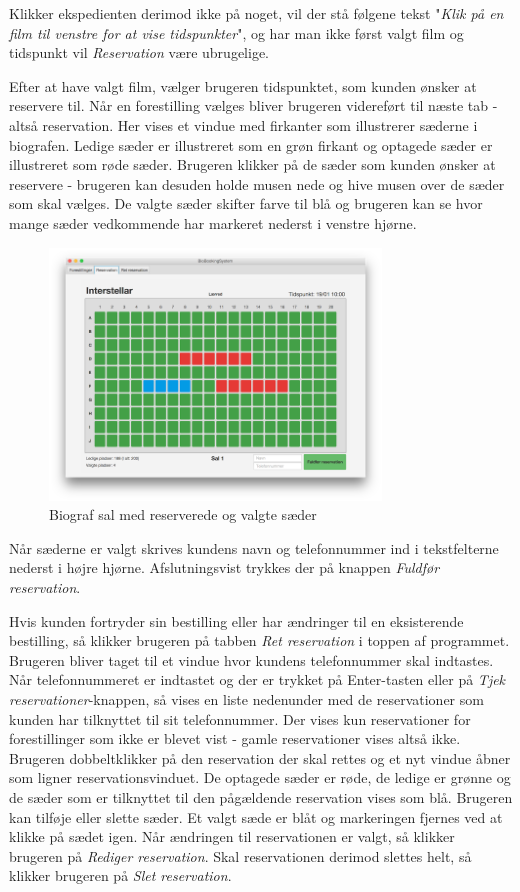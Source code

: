 \documentclass[final]{report}
\begin{document}
Klikker ekspedienten derimod ikke på noget, vil der stå følgene tekst "\emph{Klik på en film til venstre for at vise tidspunkter}", og har man ikke først valgt film og tidspunkt vil \emph{Reservation} være ubrugelige.

Efter at have valgt film, vælger brugeren tidspunktet, som kunden ønsker at reservere til. Når en forestilling vælges bliver brugeren videreført til næste tab - altså reservation. Her vises et vindue med firkanter som illustrerer sæderne i biografen. Ledige sæder er illustreret som en grøn firkant og optagede sæder er illustreret som røde sæder. Brugeren klikker på de sæder som kunden ønsker at reservere - brugeren kan desuden holde musen nede og hive musen over de sæder som skal vælges. De valgte sæder skifter farve til blå og brugeren kan se hvor mange sæder vedkommende har markeret nederst i venstre hjørne. 

\begin{figure}[h]
    \centering
    \includegraphics[width=250pt]{3.png}
    \caption{Biograf sal med reserverede og valgte sæder}
\end{figure}

Når sæderne er valgt skrives kundens navn og telefonnummer ind i tekstfelterne nederst i højre hjørne. Afslutningsvist trykkes der på knappen \emph{Fuldfør reservation}. 

Hvis kunden fortryder sin bestilling eller har ændringer til en eksisterende bestilling, så klikker brugeren på tabben \emph{Ret reservation} i toppen af programmet. Brugeren bliver taget til et vindue hvor kundens telefonnummer skal indtastes. Når telefonnummeret er indtastet og der er trykket på Enter-tasten eller på \emph{Tjek reservationer}-knappen, så vises en liste nedenunder med de reservationer som kunden har tilknyttet til sit telefonnummer. Der vises kun reservationer for forestillinger som ikke er blevet vist - gamle reservationer vises altså ikke. Brugeren dobbeltklikker på den reservation der skal rettes og et nyt vindue åbner som ligner reservationsvinduet. De optagede sæder er røde, de ledige er grønne og de sæder som er tilknyttet til den pågældende reservation vises som blå. Brugeren kan tilføje eller slette sæder. Et valgt sæde er blåt og markeringen fjernes ved at klikke på sædet igen. Når ændringen til reservationen er valgt, så klikker brugeren på \emph{Rediger reservation}. Skal reservationen derimod slettes helt, så klikker brugeren på \emph{Slet reservation}.
\end{document}
